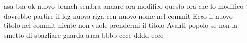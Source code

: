 \documentclass{article}
\begin{document}
asa
bsa
ok nuovo branch
sembra andare
ora modifico questo
ora che lo modifico dovrebbe partire il log
nuova riga con nuovo nome nel commit
Ecco il nuovo titolo nel commit
niente non vuole prendermi il titolo
Avanti popolo
se non la smetto di sbagliare guarda
aaaa
bbbb
cccc
dddd
eeee
\end{document}
